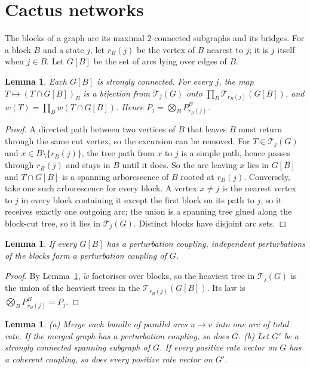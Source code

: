 \documentclass[11pt]{amsart}
\newtheorem{lemma}[theorem]{Lemma}
\theoremstyle{definition}
\theoremstyle{remark}
\newcommand{\T}{\mathcal T}
\begin{document}
\section{Cactus networks}

The blocks of a graph are its maximal $2$-connected subgraphs and its bridges. For a block $B$ and a state $j$, let $r_B(j)$ be the vertex of $B$ nearest to $j$; it is $j$ itself when $j\in B$. Let $G[B]$ be the set of arcs lying over edges of $B$.

\begin{lemma}\label{lem:blocks}
Each $G[B]$ is strongly connected. For every $j$, the map $T\mapsto(T\cap G[B])_B$ is a bijection from $\T_j(G)$ onto $\prod_B\T_{r_B(j)}(G[B])$, and $w(T)=\prod_Bw(T\cap G[B])$. Hence $P_j=\bigotimes_BP^B_{r_B(j)}$.
\end{lemma}

\begin{proof}
A directed path between two vertices of $B$ that leaves $B$ must return through the same cut vertex, so the excursion can be removed. For $T\in\T_j(G)$ and $x\in B\setminus\{r_B(j)\}$, the tree path from $x$ to $j$ is a simple path, hence passes through $r_B(j)$ and stays in $B$ until it does. So the arc leaving $x$ lies in $G[B]$ and $T\cap G[B]$ is a spanning arborescence of $B$ rooted at $r_B(j)$. Conversely, take one such arborescence for every block. A vertex $x\neq j$ is the nearest vertex to $j$ in every block containing it except the first block on its path to $j$, so it receives exactly one outgoing arc; the union is a spanning tree glued along the block-cut tree, so it lies in $\T_j(G)$. Distinct blocks have disjoint arc sets.
\end{proof}

\begin{lemma}\label{lem:glue}
If every $G[B]$ has a perturbation coupling, independent perturbations of the blocks form a perturbation coupling of $G$.
\end{lemma}

\begin{proof}
By Lemma~\ref{lem:blocks}, $\widetilde w$ factorises over blocks, so the heaviest tree in $\T_j(G)$ is the union of the heaviest trees in the $\T_{r_B(j)}(G[B])$. Its law is $\bigotimes_BP^B_{r_B(j)}=P_j$.
\end{proof}

\begin{lemma}\label{lem:limits}
(a) Merge each bundle of parallel arcs $u\to v$ into one arc of total rate. If the merged graph has a perturbation coupling, so does $G$. (b) Let $G'$ be a strongly connected spanning subgraph of $G$. If every positive rate vector on $G$ has a coherent coupling, so does every positive rate vector on $G'$.
\end{lemma}
\end{document}
